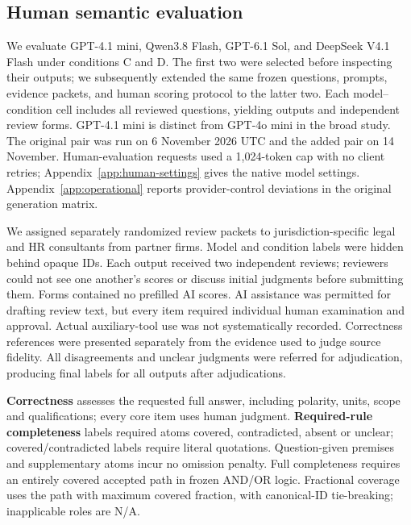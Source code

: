 \documentclass[11pt]{article}
\DeclareRobustCommand{\claim}[2]{#2}
\begin{document}







\subsection{Human semantic evaluation}
\claim{HUMANPROTOCOL}{We evaluate GPT-4.1 mini, Qwen3.8 Flash, GPT-6.1 Sol, and DeepSeek V4.1 Flash under conditions C and D. The first two were selected before inspecting their outputs; we subsequently extended the same frozen questions, prompts, evidence packets, and human scoring protocol to the latter two. Each model--condition cell includes all \RNCore{} reviewed questions, yielding \RNAudit{} outputs and \RNForms{} independent review forms. GPT-4.1 mini is distinct from GPT-4o mini in the broad study. The original pair was run on 6 November 2026 UTC and the added pair on 14 November. Human-evaluation requests used a 1,024-token cap with no client retries; Appendix~\ref{app:human-settings} gives the native model settings. Appendix~\ref{app:operational} reports provider-control deviations in the original generation matrix.}

\claim{HUMANPROTOCOL}{We assigned separately randomized review packets to jurisdiction-specific legal and HR consultants from partner firms. Model and condition labels were hidden behind opaque IDs. Each output received two independent reviews; reviewers could not see one another's scores or discuss initial judgments before submitting them. Forms contained no prefilled AI scores. AI assistance was permitted for drafting review text, but every item required individual human examination and approval. Actual auxiliary-tool use was not systematically recorded. Correctness references were presented separately from the evidence used to judge source fidelity. All disagreements and unclear judgments were referred for adjudication, producing final labels for all \RNAudit{} outputs after \RNAdj{} adjudications.}

\claim{HUMANMETRICS}{\textbf{Correctness} assesses the requested full answer, including polarity, units, scope and qualifications; every core item uses human judgment. \textbf{Required-rule completeness} labels required atoms covered, contradicted, absent or unclear; covered/contradicted labels require literal quotations. Question-given premises and supplementary atoms incur no omission penalty. Full completeness requires an entirely covered accepted path in frozen AND/OR logic. Fractional coverage uses the path with maximum covered fraction, with canonical-ID tie-breaking; inapplicable roles are N/A.}
\end{document}
